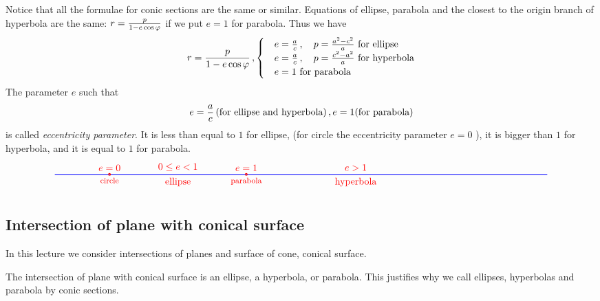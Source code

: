 \documentclass[12pt]{article}
\numberwithin{equation}{section}
\begin{document}
{  Notice that all the formulae for conic
sections are the same or similar.
 Equations of ellipse, parabola
and the closest to the origin branch of hyperbola are 
the same: $r={p\over 1-e\cos\varphi}$ 
if we put $e=1$ for parabola. Thus we have 
             \begin{equation}\label{equationforall}
              r={p\over 1-e\cos\varphi}\,,
        \begin {cases}
  &e={a\over c}\,,\quad 
  p={a^2-c^2\over a}\,\,\hbox{for ellipse}\cr 
  &e={a\over c}\,,\quad 
   p={c^2-a^2\over a}\,\,\hbox{for hyperbola}\cr 
  & e=1\,\,\hbox{for parabola}\cr 
        \end {cases}
             \end{equation}
The parameter $e$ such that
              $$
e={a\over c}\,(\hbox{for ellipse and hyperbola})\,,
e=1 (\hbox {for parabola}) 
              $$
 is called
{\it eccentricity parameter}. It is less than equal to $1$
for ellipse,
(for circle the eccentricity parameter 
$e=0$ ), it is bigger than $1$ for hyperbola, and it is equal
to $1$ for parabola. 
   \begin{equation}\label{thirdparabola}
\begin{tikzpicture}%
\draw [  thick, blue] (-10,0)--(8,0); 
\draw[red,thick] (-8,0) circle (1pt); 
\node [red,above] at (-8, 0) { $e=0$};
\node [red,below] at (-8, 0) {\footnotesize circle};
\node [red,above] at (-5.5,0) { $0\leq e <1$};
\node [red,below] at (-5.5, 0) { ellipse};
\draw[red,thick] (-3,0) circle (1pt); 
\node [red,above] at (-3, 0) { $e=1$};
\node [red,below] at (-3, 0) {\footnotesize parabola};
\node [red,above] at (1, 0) { $e>1$};
\node [red,below] at (1, 0) {hyperbola};
\end{tikzpicture}
\end{equation}

}



\subsection {Intersection of plane with conical  surface}
\label{intersection}

In this lecture we consider intersections of
planes and surface of cone, conical surface.

 The intersection of plane with conical surface
is an ellipse, a hyperbola, or parabola.
 This justifies why we call
ellipses, hyperbolas and parabola by conic sections. 
\end{document}
